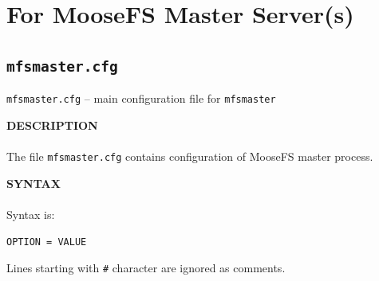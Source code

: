 \documentclass[a4paper,11pt,english]{report}
\def\code#1{\texttt{#1}}
\begin{document}
		\section{For MooseFS Master Server(s)}
			\bigskip
			\begin{center}
				\textbf{}
			\end{center}
			\bigskip
			
			\subsection{\code{mfsmaster.cfg}}
				\code{mfsmaster.cfg} -- main configuration file for \code{mfsmaster}

				\bigskip
				\textbf{DESCRIPTION} \\\\
					The   file  \code{mfsmaster.cfg}  contains  configuration  of  MooseFS  master
					process.

				\bigskip
				\textbf{SYNTAX} \\\\
				Syntax is:
				
				\code{OPTION = VALUE}

				Lines starting with \code{\#} character are ignored as comments.
				
\end{document}
